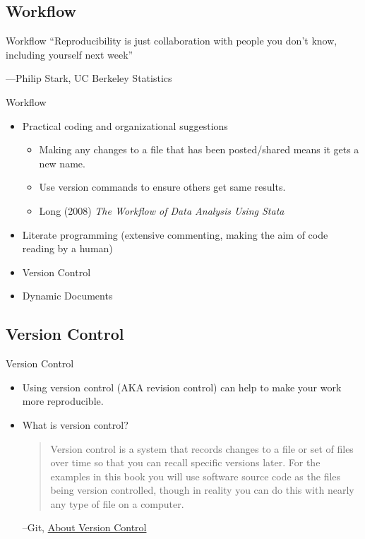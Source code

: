 \documentclass{beamer}
\begin{document}
 \subsection*{Workflow}
 \begin{frame}{Workflow}
``Reproducibility is just collaboration with people you don't know,
including yourself next week''

---Philip Stark, UC Berkeley Statistics
\end{frame}
\begin{frame}{Workflow}

 \begin{itemize}
 \item Practical coding and organizational suggestions
 \begin{itemize}[<.->]
 	\item Making any changes to a file that has been posted/shared means it gets a new name.
 	\item Use version commands to ensure others get same results.
 	\item Long (2008) \textit{The Workflow of Data Analysis Using Stata}
  \end{itemize}
 \item Literate programming (extensive commenting, making the aim of code reading by a human)
 \item Version Control
 \item Dynamic Documents
\end{itemize}
\end{frame}

\subsection*{Version Control}
\begin{frame}{Version Control}
\begin{itemize}[<.->]
\item
Using version control (AKA revision control) can help to make your work more reproducible.

\item
What is version control?

\begin{quote}
Version control is a system that records changes to a file or set of files over time so that you can recall specific versions later. For the examples in this book you will use software source code as the files being version controlled, though in reality you can do this with nearly any type of file on a computer.
\end{quote}
--Git, \href{https://git-scm.com/book/en/v2/Getting-Started-About-Version-Control}{About Version Control}
\end{itemize}
\end{frame}
\end{document}
